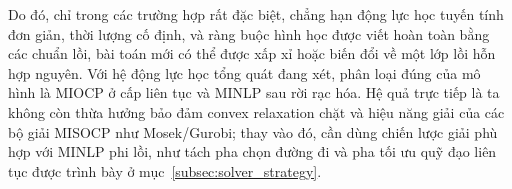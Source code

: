 Do đó, chỉ trong các trường hợp rất đặc biệt, chẳng hạn động lực học tuyến tính đơn giản, thời lượng cố định, và ràng buộc hình học được viết hoàn toàn bằng các chuẩn lồi, bài toán mới có thể được xấp xỉ hoặc biến đổi về một lớp lồi hỗn hợp nguyên. Với hệ động lực học tổng quát đang xét, phân loại đúng của mô hình là MIOCP ở cấp liên tục và MINLP sau rời rạc hóa. Hệ quả trực tiếp là ta không còn thừa hưởng bảo đảm convex relaxation chặt và hiệu năng giải của các bộ giải MISOCP như Mosek/Gurobi; thay vào đó, cần dùng chiến lược giải phù hợp với MINLP phi lồi, như tách pha chọn đường đi và pha tối ưu quỹ đạo liên tục được trình bày ở mục~\ref{subsec:solver_strategy}.
